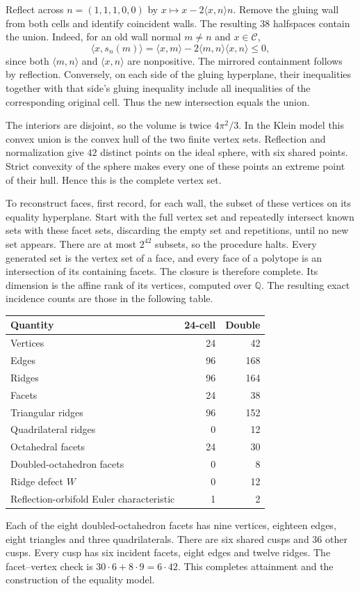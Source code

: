 \documentclass[11pt]{article}
\theoremstyle{remark}
\newcommand{\ip}[2]{\langle #1,#2\rangle}
\newcommand{\CELL}{\mathcal C}
\begin{document}
Reflect across $n=(1,1,1,0,0)$ by
$x\mapsto x-2\ip{x}{n}n$. Remove the gluing wall from both cells
and identify coincident walls. The resulting 38 halfspaces contain
the union. Indeed, for an old wall normal $m\ne n$ and $x\in\CELL$,
\[
 \ip{x}{s_n(m)}=\ip{x}{m}-2\ip{m}{n}\ip{x}{n}\le0,
\]
since both $\ip{m}{n}$ and $\ip{x}{n}$ are nonpositive. The
mirrored containment follows by reflection. Conversely, on each side of the gluing hyperplane, their
inequalities together with that side's gluing inequality include all
inequalities of the corresponding original cell. Thus the new
intersection equals the union.

The interiors are disjoint, so the volume is twice $4\pi^2/3$.
In the Klein model this convex union is the convex hull
of the two finite vertex sets. Reflection and normalization give
$42$ distinct points on the ideal sphere, with six shared points.
Strict convexity of the sphere makes every one of these points an
extreme point of their hull. Hence this is the complete vertex set.

To reconstruct faces, first record, for each wall, the subset of these
vertices on its equality hyperplane. Start with the full vertex set
and repeatedly intersect known sets with these facet sets, discarding
the empty set and repetitions, until no new set appears. There are
at most $2^{42}$ subsets, so the procedure halts. Every generated set
is the vertex set of a face, and every face of a polytope is an
intersection of its containing facets. The closure is therefore
complete. Its dimension is the affine rank of its vertices, computed
over $\mathbb Q$. The resulting exact incidence counts are those
in the following table.
\begin{center}
\begin{tabular}{lrr}
\toprule Quantity&24-cell&Double\\\midrule
Vertices&24&42\\ Edges&96&168\\ Ridges&96&164\\ Facets&24&38\\
Triangular ridges&96&152\\ Quadrilateral ridges&0&12\\
Octahedral facets&24&30\\ Doubled-octahedron facets&0&8\\
Ridge defect $W$&0&12\\ Reflection-orbifold Euler characteristic&1&2\\
\bottomrule
\end{tabular}
\end{center}
Each of the eight doubled-octahedron facets has nine vertices, eighteen
edges, eight triangles and three quadrilaterals. There are six shared
cusps and 36 other cusps. Every cusp has six incident facets, eight
edges and twelve ridges. The facet--vertex check is
$30\cdot6+8\cdot9=6\cdot42$. This completes attainment and
the construction of the equality model.
\end{document}
